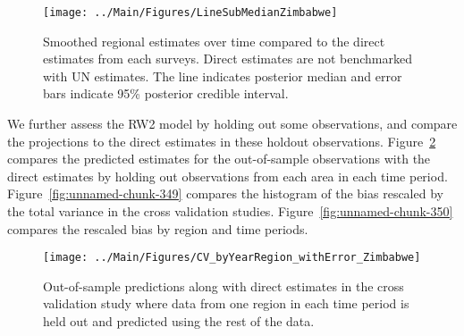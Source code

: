 \documentclass[12pt]{article}\usepackage[]{graphicx}\usepackage[]{color}
\newenvironment{knitrout}{}{} %
\begin{document}
\begin{knitrout}
\color{fgcolor}\begin{figure}[bht]

{\centering \texttt{[image: ../Main/Figures/LineSubMedianZimbabwe]} 

}

\caption[Smoothed regional estimates over time compared to the direct estimates from each surveys]{Smoothed regional estimates over time compared to the direct estimates from each surveys. Direct estimates are not benchmarked with UN estimates. The line indicates posterior median and error bars indicate 95\% posterior credible interval.}\label{fig:unnamed-chunk-347}
\end{figure}


\end{knitrout}
We further assess the RW2 model by holding out some observations, and compare the projections to the direct estimates in these holdout observations. Figure~\ref{fig:unnamed-chunk-348} compares the predicted estimates for the out-of-sample observations  with the direct estimates by holding out observations from each area in each time period.  Figure~\ref{fig:unnamed-chunk-349} compares the histogram of the bias rescaled by the total variance in the cross validation studies. Figure~\ref{fig:unnamed-chunk-350} compares the rescaled bias by region and time periods.



 
\begin{knitrout}
\color{fgcolor}\begin{figure}[bht]

{\centering \texttt{[image: ../Main/Figures/CV\_byYearRegion\_withError\_Zimbabwe]} 

}

\caption[Out-of-sample predictions along with direct estimates in the cross validation study where data from one region in each time period is held out and predicted using the rest of the data]{Out-of-sample predictions along with direct estimates in the cross validation study where data from one region in each time period is held out and predicted using the rest of the data.}\label{fig:unnamed-chunk-348}
\end{figure}


\end{knitrout}
\end{document}
